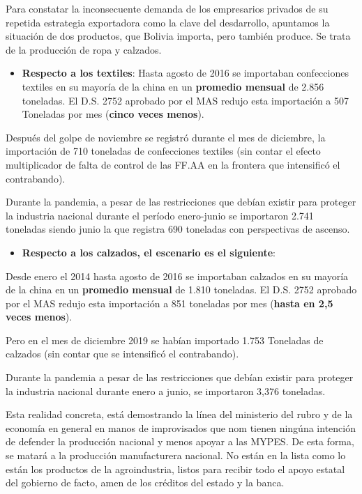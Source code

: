 \documentclass[a4paper, nobind]{templates/ociamthesis}
\providecommand{\tightlist}{%
  \setlength{\itemsep}{0pt}\setlength{\parskip}{0pt}}
\begin{document}
Para constatar la inconsecuente demanda de los empresarios privados de su repetida estrategia exportadora como la clave del desdarrollo, apuntamos la situación de dos productos, que Bolivia importa, pero también produce. Se trata de la producción de ropa y calzados.

\begin{itemize}
\tightlist
\item
  \textbf{Respecto a los textiles}:
  Hasta agosto de 2016 se importaban confecciones textiles en su mayoría de la china en un \textbf{promedio mensual} de 2.856 toneladas. El D.S. 2752 aprobado por el MAS redujo esta importación a 507 Toneladas por mes (\textbf{cinco veces menos}).
\end{itemize}

Después del golpe de noviembre se registró durante el mes de diciembre, la importación de 710 toneladas de confecciones textiles (sin contar el efecto multiplicador de falta de control de las FF.AA en la frontera que intensificó el contrabando).

Durante la pandemia, a pesar de las restricciones que debían existir para proteger la industria nacional durante el período enero-junio se importaron 2.741 toneladas siendo junio la que registra 690 toneladas con perspectivas de ascenso.

\begin{itemize}
\tightlist
\item
  \textbf{Respecto a los calzados, el escenario es el siguiente}:
\end{itemize}

Desde enero el 2014 hasta agosto de 2016 se importaban calzados en su mayoría de la china en un \textbf{promedio mensual} de 1.810 toneladas. El D.S. 2752 aprobado por el MAS redujo esta importación a 851 toneladas por mes (\textbf{hasta en 2,5 veces menos}).

Pero en el mes de diciembre 2019 se habían importado 1.753 Toneladas de calzados (sin contar que se intensificó el contrabando).

Durante la pandemia a pesar de las restricciones que debían existir para proteger la industria nacional durante enero a junio, se importaron 3,376 toneladas.

Esta realidad concreta, está demostrando la línea del ministerio del rubro y de la economía en general en manos de improvisados que nom tienen ningúna intención de defender la producción nacional y menos apoyar a las MYPES. De esta forma, se matará a la producción manufacturera nacional. No están en la lista como lo están los productos de la agroindustria, listos para recibir todo el apoyo estatal del gobierno de facto, amen de los créditos del estado y la banca.
\end{document}
